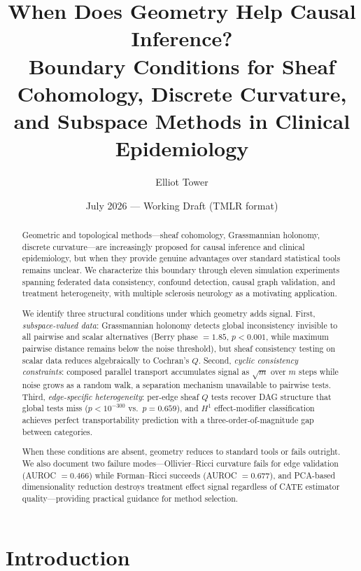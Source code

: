 \documentclass[11pt]{article}
\title{When Does Geometry Help Causal Inference?\\
Boundary Conditions for Sheaf Cohomology, Discrete Curvature,\\
and Subspace Methods in Clinical Epidemiology}
\author{
Elliot Tower
}
\date{July 2026 --- Working Draft (TMLR format)}
\begin{document}
\maketitle

\begin{abstract}
Geometric and topological methods---sheaf cohomology, Grassmannian holonomy, discrete curvature---are increasingly proposed for causal inference and clinical epidemiology, but when they provide genuine advantages over standard statistical tools remains unclear.
We characterize this boundary through eleven simulation experiments spanning federated data consistency, confound detection, causal graph validation, and treatment heterogeneity, with multiple sclerosis neurology as a motivating application.

We identify three structural conditions under which geometry adds signal.
First, \emph{subspace-valued data}: Grassmannian holonomy detects global inconsistency invisible to all pairwise and scalar alternatives (Berry phase $= 1.85$, $p < 0.001$, while maximum pairwise distance remains below the noise threshold), but sheaf consistency testing on scalar data reduces algebraically to Cochran's $Q$.
Second, \emph{cyclic consistency constraints}: composed parallel transport accumulates signal as $\sqrt{m}$ over $m$ steps while noise grows as a random walk, a separation mechanism unavailable to pairwise tests.
Third, \emph{edge-specific heterogeneity}: per-edge sheaf $Q$ tests recover DAG structure that global tests miss ($p < 10^{-300}$ vs.\ $p = 0.659$), and $H^1$ effect-modifier classification achieves perfect transportability prediction with a three-order-of-magnitude gap between categories.

When these conditions are absent, geometry reduces to standard tools or fails outright.
We also document two failure modes---Ollivier--Ricci curvature fails for edge validation (AUROC $= 0.466$) while Forman--Ricci succeeds (AUROC $= 0.677$), and PCA-based dimensionality reduction destroys treatment effect signal regardless of CATE estimator quality---providing practical guidance for method selection.
\end{abstract}

\section{Introduction}
\label{sec:intro}
\end{document}
